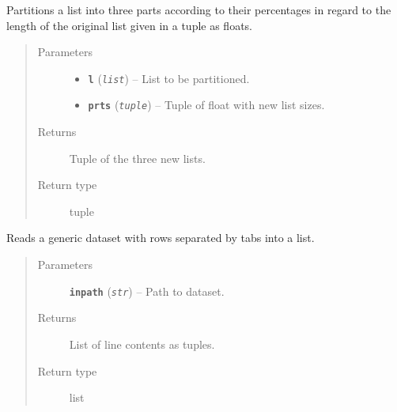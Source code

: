\documentclass[letterpaper,10pt,english]{sphinxmanual}
\begin{document}
\begin{fulllineitems}
\label{src.misc:src.misc.helpers.partitions_list}
Partitions a list into three parts according to their percentages in regard to the length of the original list given
in a tuple as floats.
\begin{quote}\begin{description}
\item[{Parameters}] \leavevmode\begin{itemize}
\item {} 
\textbf{\texttt{l}} (\emph{\texttt{list}}) -- List to be partitioned.

\item {} 
\textbf{\texttt{prts}} (\emph{\texttt{tuple}}) -- Tuple of float with new list sizes.

\end{itemize}

\item[{Returns}] \leavevmode
Tuple of the three new lists.

\item[{Return type}] \leavevmode
tuple

\end{description}\end{quote}

\end{fulllineitems}


\begin{fulllineitems}
\label{src.misc:src.misc.helpers.read_dataset}
Reads a generic dataset with rows separated by tabs into a list.
\begin{quote}\begin{description}
\item[{Parameters}] \leavevmode
\textbf{\texttt{inpath}} (\emph{\texttt{str}}) -- Path to dataset.

\item[{Returns}] \leavevmode
List of line contents as tuples.

\item[{Return type}] \leavevmode
list

\end{description}\end{quote}

\end{fulllineitems}
\end{document}
